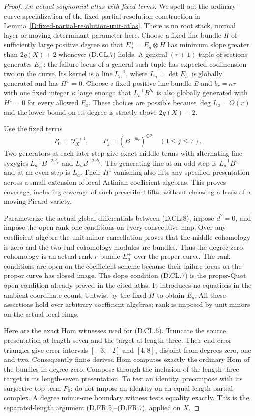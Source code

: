 \begin{proof}
\emph{An actual polynomial atlas with fixed terms.}
We spell out the ordinary-curve specialization of the fixed
partial-resolution construction in
Lemma~\ref{D:fixed-partial-resolution-unit-atlas}. There is no
root stack, normal layer or moving determinant parameter here.
Choose a fixed line bundle $H$ of sufficiently large positive degree
so that $E_a^+=E_a\otimes H$ has minimum slope greater than
$2g(X)+2$ whenever (D.CL.7) holds. A general $(r+1)$-tuple of
sections generates $E_a^+$: the failure locus of a general such
tuple has expected codimension two on the curve. Its kernel is
a line $L_a^{-1}$, where $L_a=\det E_a^+$ is globally generated
and has $H^1=0$. Choose a fixed positive line bundle $B$ and
$b_r=\kappa r$ with one fixed integer $\kappa$ large enough that
$L_a^{-1}B^{b_r}$ is also globally generated with $H^1=0$ for every
allowed $E_a$. These choices are possible because $\deg L_a=O(r)$
and the lower bound on its degree is strictly above $2g(X)-2$.

Use the fixed terms
\[
 P_0=\mathcal O_X^{r+1},\qquad
 P_j=(B^{-j b_r})^{\oplus2}\quad(1\leq j\leq7).
 \tag{D.CL.8}
\]
Two generators at each later step give exact middle terms with
alternating line syzygies
$L_a^{-1}B^{-2v b_r}$ and $L_aB^{-2v b_r}$.
The generating line at an odd step is $L_a^{-1}B^{b_r}$ and
at an even step is $L_a$. Their $H^1$ vanishing also lifts any
specified presentation across a small extension of local Artinian
coefficient algebras. This proves coverage, including coverage of
such prescribed lifts, without choosing a basis of a moving Picard
variety.

Parameterize the actual global differentials between (D.CL.8),
impose $d^2=0$, and impose the open rank-one conditions on every
consecutive map. Over any coefficient algebra the unit-minor
cancellation proves that the middle cohomology is zero and the two
end cohomology modules are bundles. Thus the degree-zero cohomology
is an actual rank-$r$ bundle $E_a^+$ over the proper curve. The
rank conditions are open on the coefficient scheme because their
failure locus on the proper curve has closed image. The slope
condition (D.CL.7) is the proper-Quot open condition already proved
in the cited atlas. It introduces no equations in the ambient
coordinate count. Untwist by the fixed $H$ to obtain $E_a$.
All these assertions hold over arbitrary coefficient algebras;
rank is imposed by unit minors on the actual local rings.

Here are the exact Hom witnesses used for (D.CL.6). Truncate the
source presentation at length seven and the target at length three.
Their end-error triangles give error intervals $[-3,-2]$ and
$[4,8]$, disjoint from degrees zero, one and two. Consequently
finite derived Hom computes exactly the ordinary Hom of the
bundles in degree zero. Compose through the inclusion of the
length-three target in its length-seven presentation. To test an
identity, precompose with its surjective top term $P_0$; do not
impose an identity on an equal-length partial complex. A degree
minus-one boundary witness tests equality exactly. This is the
separated-length argument (D.FR.5)--(D.FR.7), applied on $X$.


\end{proof}
